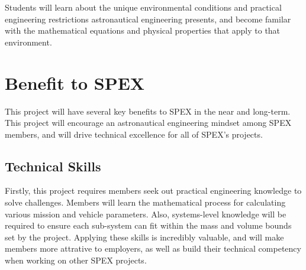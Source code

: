 \documentclass[conference]{IEEEtran} %
\begin{document}
Students will learn about the unique environmental conditions and practical engineering restrictions astronautical engineering presents, and become familar with the mathematical equations and physical properties that apply to that environment.


\section{Benefit to SPEX}
\label{sec:benefit}

This project will have several key benefits to SPEX in the near and long-term.
This project will encourage an astronautical engineering mindset among SPEX members, and will drive technical excellence for all of SPEX's projects.


\subsection{Technical Skills}
\label{subsec:mindset}
Firstly, this project requires members seek out practical engineering knowledge to solve challenges.
Members will learn the mathematical process for calculating various mission and vehicle parameters.
Also, systems-level knowledge will be required to ensure each sub-system can fit within the mass and volume bounds set by the project.
Applying these skills is incredibly valuable, and will make members more attrative to employers, as well as build their technical competency when working on other SPEX projects.
\end{document}
